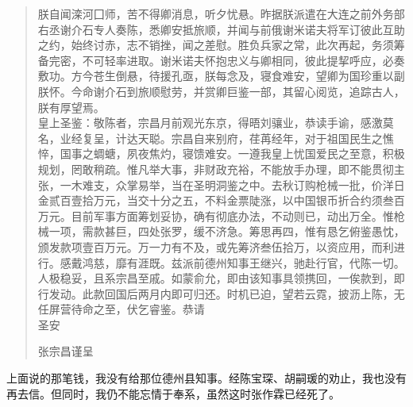 \begin{quote}
	朕自闻滦河囗师，苦不得卿消息，听夕忧悬。昨据朕派遣在大连之前外务部右丞谢介石专人奏陈，悉卿安抵旅顺，并闻与前俄谢米诺夫将军订彼此互助之约，始终讨赤，志不销挫，闻之差慰。胜负兵家之常，此次再起，务须筹备完密，不可轻率进取。谢米诺夫怀抱忠义与卿相同，彼此提挈呼应，必奏敷功。方今苍生倒悬，待援孔亟，朕每念及，寝食难安，望卿为国珍重以副朕怀。今命谢介石到旅顺慰劳，并赏卿巨鉴一部，其留心阅览，追踪古人，朕有厚望焉。\\

皇上圣鉴：敬陈者，宗昌月前观光东京，得晤刘骧业，恭读手谕，感激莫名，业经复呈，计达天聪。宗昌自来别府，荏苒经年，对于祖国民生之憔悴，国事之蜩螗，夙夜焦灼，寝馈难安。一遵我皇上忧国爱民之至意，积极规划，罔敢稍疏。惟凡举大事，非财政充裕，不能放手办理，即不能贯彻主张，一木难支，众掌易举，当在圣明洞鉴之中。去秋订购枪械一批，价洋日金贰百壹拾万元，当交十分之五，不料金票陡涨，以中国银币折合约须叁百万元。目前军事方面筹划妥协，确有彻底办法，不动则已，动出万全。惟枪械一项，需款甚巨，四处张罗，缓不济急。筹思再四，惟有恳乞俯鉴愚忱，颁发款项壹百万元。万一力有不及，或先筹济叁伍拾万，以资应用，而利进行。感戴鸿慈，靡有涯既。兹派前德州知事王继兴，驰赴行官，代陈一切。人极稳妥，且系宗昌至戚。如蒙俞允，即由该知事具领携回，一俟款到，即行发动。此款回国后两月内即可归还。时机已迫，望若云霓，披沥上陈，无任屏营待命之至，伏乞睿鉴。恭请\\

圣安\\

\begin{flushright}
	张宗昌谨呈\\
\end{flushright}
\end{quote}

上面说的那笔钱，我没有给那位德州县知事。经陈宝琛、胡嗣瑗的劝止，我也没有再去信。但同时，我仍不能忘情于奉系，虽然这时张作霖已经死了。\\

